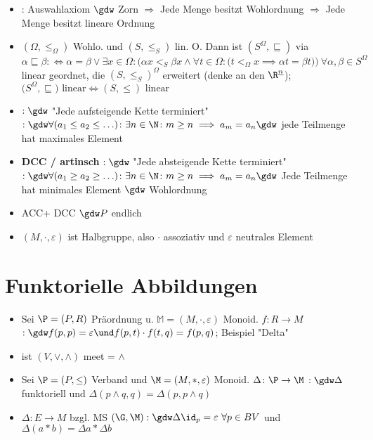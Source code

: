 \begin{itemize}
		\item {}: Auswahlaxiom $\gdw$ Zorn $\Rightarrow$ Jede Menge besitzt Wohlordnung $\Rightarrow$ Jede Menge besitzt lineare Ordnung
		\item $(\Omega,\leq_\Omega)$ Wohlo. und $(S,\leq_S)$ lin. O.
		Dann ist $(S^\Omega,\sqsubseteq)$ via \\
		$
		\alpha\sqsubseteq\beta:\Longleftrightarrow\alpha=\beta\vee\exists x\in\Omega:\Big(\alpha x<_S\beta x\wedge\forall t\in\Omega:\big(t<_\Omega x\implies \alpha t=\beta t\big)\Big)
		~\forall\alpha,\beta\in S^\Omega
		$
		linear geordnet, die $(S,\leq_S)^\Omega$ erweitert (denke an den $\R^{\underline{n}}$); $\big(S^\Omega,\sqsubseteq\big)\text{ linear}\Longleftrightarrow(S,\leq)\text{ linear}$
		\item {} $:\gdw$ "Jede aufsteigende Kette terminiert" $:\gdw\forall(a_1\leq a_2\leq\ldots)\colon\exists n\in\N\colon m\geq n\implies a_m=a_n\gdw$ jede Teilmenge hat maximales Element
		\item \textbf{DCC / artinsch} $:\gdw$ "Jede absteigende Kette terminiert"
		$:\gdw\forall(a_1\geq a_2\geq\ldots)\colon\exists n\in\N\colon m\geq n\implies a_m=a_n\gdw$ Jede Teilmenge hat minimales Element $\gdw$ Wohlordnung
		\item ACC+ DCC $\gdw P$ endlich
		\item {} $(M,\cdot,\varepsilon)$ ist Halbgruppe, also $\cdot$ assoziativ und $\varepsilon$ neutrales Element
	\end{itemize}
	
	\section{Funktorielle Abbildungen}
	\begin{itemize}
		\item Sei $\P=(P,R)$ Präordnung u. $\mathbb{M}=(M,\cdot,\varepsilon)$ Monoid. $f:R\to M$  $:\gdw f(p,p)=\varepsilon\und f(p,t)\cdot f(t,q)=f(p,q)$; Beispiel "Delta" 
		\item {} ist $(V,\vee,\wedge)$ meet = $\wedge$
	    \item Sei $\P=(P,\leq)$ Verband und $\M=(M,\ast,\varepsilon)$ Monoid. 
	    $\Delta\colon\P\to\M$  $:\gdw\Delta$ funktoriell und $\Delta(p\wedge q,q)=\Delta(p,p\wedge q)$
		\item $\Delta\colon E\to M$  bzgl. MS $(\G,\M):\gdw\Delta\id_p=\varepsilon~\forall p\in BV$ und $\Delta(a\ast b)=\Delta a\ast\Delta b$
	\end{itemize}
	
